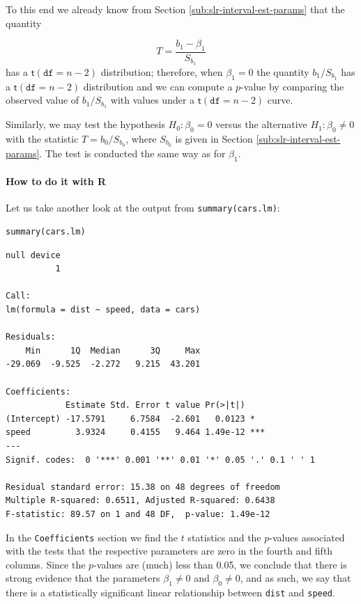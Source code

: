 \documentclass[captions=tableheading]{scrbook}
\begin{document}
To this end we already know from Section \ref{sub:slr-interval-est-params} that the quantity

\begin{equation} 
T=\frac{b_{1}-\beta_{1}}{S_{b_{1}}}
\end{equation}
has a \(\mathsf{t}(\mathtt{df}=n-2)\) distribution; therefore, when \(\beta_{1}=0\) the quantity \(b_{1}/S_{b_{1}}\) has a \(\mathsf{t}(\mathtt{df}=n-2)\) distribution and we can compute a \(p\)-value by comparing the observed value of \(b_{1}/S{}_{b_{1}}\) with values under a \(\mathsf{t}(\mathtt{df}=n-2)\) curve. 

Similarly, we may test the hypothesis \(H_{0}:\beta_{0}=0\) versus the alternative \(H_{1}:\beta_{0}\neq0\) with the statistic \(T=b_{0}/S_{b_{0}}\), where \(S_{b_{0}}\) is given in Section \ref{sub:slr-interval-est-params}. The test is conducted the same way as for \(\beta_{1}\). 


\paragraph*{How to do it with \textsf{R}}

Let us take another look at the output from \texttt{summary(cars.lm)}:


\begin{verbatim}
summary(cars.lm)
\end{verbatim}


\begin{verbatim}
null device 
          1
 
Call:
lm(formula = dist ~ speed, data = cars)

Residuals:
    Min      1Q  Median      3Q     Max 
-29.069  -9.525  -2.272   9.215  43.201 

Coefficients:
            Estimate Std. Error t value Pr(>|t|)    
(Intercept) -17.5791     6.7584  -2.601   0.0123 *  
speed         3.9324     0.4155   9.464 1.49e-12 ***
---
Signif. codes:  0 '***' 0.001 '**' 0.01 '*' 0.05 '.' 0.1 ' ' 1 

Residual standard error: 15.38 on 48 degrees of freedom
Multiple R-squared: 0.6511,	Adjusted R-squared: 0.6438 
F-statistic: 89.57 on 1 and 48 DF,  p-value: 1.49e-12
\end{verbatim}

In the \texttt{Coefficients} section we find the \(t\) statistics and the \(p\)-values associated with the tests that the respective parameters are zero in the fourth and fifth columns. Since the \(p\)-values are (much) less than 0.05, we conclude that there is strong evidence that the parameters \(\beta_{1}\neq0\) and \(\beta_{0}\neq0\), and as such, we say that there is a statistically significant linear relationship between \texttt{dist} and \texttt{speed}. 
\end{document}

